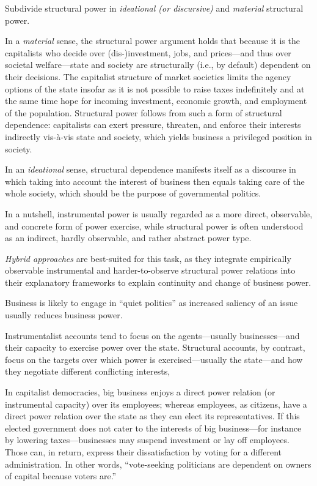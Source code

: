 \documentclass[
]{book}
\begin{document}
Subdivide structural power in \emph{ideational (or discursive)} and \emph{material} structural power.

In a \emph{material} sense, the structural power argument holds that because it is the capitalists who decide over (dis-)investment, jobs, and prices---and thus over societal welfare---state and society are structurally (i.e., by default) dependent on their decisions.
The capitalist structure of market societies limits the agency options of the state insofar as it is not possible to raise taxes indefinitely and at the same time hope for incoming investment, economic growth, and employment of the population.
Structural power follows from such a form of structural dependence: capitalists can exert pressure, threaten, and enforce their interests indirectly vis-à-vis state and society, which yields business a privileged position in society.

In an \emph{ideational} sense, structural dependence manifests itself as a discourse in which taking into account the interest of business then equals taking care of the whole society, which should be the purpose of governmental politics.

In a nutshell, instrumental power is usually regarded as a more direct, observable, and concrete form of power exercise, while structural power is often understood as an indirect, hardly observable, and rather abstract power type.

\emph{Hybrid approaches} are best-suited for this task, as they integrate empirically observable instrumental and harder-to-observe structural power relations into their explanatory frameworks to explain continuity and change of business power.

Business is likely to engage in ``quiet politics'' as increased saliency of an issue usually reduces business power.

Instrumentalist accounts tend to focus on the agents---usually businesses---and their capacity to exercise power over the state. Structural accounts, by contrast, focus on the targets over which power is exercised---usually the state---and how they negotiate different conflicting interests,

In capitalist democracies, big business enjoys a direct power relation (or instrumental capacity) over its employees; whereas employees, as citizens, have a direct power relation over the state as they can elect its representatives. If this elected government does not cater to the interests of big business---for instance by lowering taxes---businesses may suspend investment or lay off employees. Those can, in return, express their dissatisfaction by voting for a different administration. In other words, ``vote-seeking politicians are dependent on owners of capital because voters are.''
\end{document}
